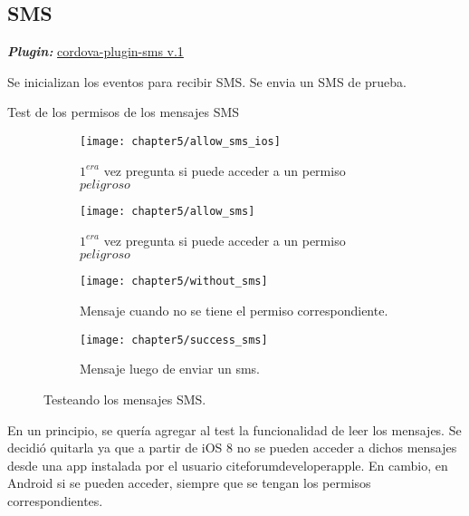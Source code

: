 \subsection*{SMS}
\textbf{\emph{Plugin:}} \href{https://github.com/floatinghotpot/cordova-plugin-sms}{cordova-plugin-sms v.1}\\
\begin{algorithm}
	\begin{algorithmic}[1]
		\STATE Se inicializan los eventos para recibir SMS. 
		\STATE Se envia un SMS de prueba.
	\end{algorithmic}
	\caption{Test de los permisos de los mensajes SMS}\label{alg:chap5_test_sms}
\end{algorithm}
\begin{figure}[!ht]
	\begin{subfigure}{.32\textwidth}
	    \centering
		\texttt{[image: chapter5/allow\_sms\_ios]}
		\caption{$1^{era}$ vez pregunta si puede acceder a un permiso $peligroso$}
		\label{fig:chapter05:allow_sms_ios}
	\end{subfigure}
	\begin{subfigure}{.32\textwidth}
	    \centering
		\texttt{[image: chapter5/allow\_sms]}
		\caption{$1^{era}$ vez pregunta si puede acceder a un permiso $peligroso$}
		\label{fig:chapter05:allow_sms}
	\end{subfigure}		
	\begin{subfigure}{.32\textwidth}
	    \centering
		\texttt{[image: chapter5/without\_sms]}
		\caption{Mensaje cuando no se tiene el permiso correspondiente.}
		\label{fig:chapter05:without_sms}
	\end{subfigure}
	\begin{subfigure}{.32\textwidth}
	    \centering
		\texttt{[image: chapter5/success\_sms]}
		\caption{Mensaje luego de enviar un sms.}
		\label{fig:chapter05:success_sms}
	\end{subfigure}
	\caption{Testeando los mensajes SMS.}
	\label{fig:chapter05:sms_test}
\end{figure}
En un principio, se quer\'ia agregar al test la funcionalidad de leer los mensajes. Se decidi\'o quitarla ya que a partir de iOS 8 no se pueden acceder a dichos mensajes desde una app instalada por el usuario cite{forumdeveloperapple}. En cambio, en Android si se pueden acceder, siempre que se tengan los permisos correspondientes.
